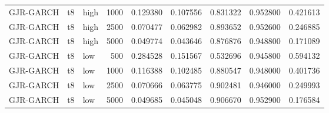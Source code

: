 \begin{tabular}{lllrrrrrr}
GJR-GARCH & t8 & high & 1000 & 0.129380 & 0.107556 & 0.831322 & 0.952800 & 0.421613 \\
GJR-GARCH & t8 & high & 2500 & 0.070477 & 0.062982 & 0.893652 & 0.952600 & 0.246885 \\
GJR-GARCH & t8 & high & 5000 & 0.049774 & 0.043646 & 0.876876 & 0.948800 & 0.171089 \\
GJR-GARCH & t8 & low & 500 & 0.284528 & 0.151567 & 0.532696 & 0.945800 & 0.594132 \\
GJR-GARCH & t8 & low & 1000 & 0.116388 & 0.102485 & 0.880547 & 0.948000 & 0.401736 \\
GJR-GARCH & t8 & low & 2500 & 0.070666 & 0.063775 & 0.902481 & 0.946000 & 0.249993 \\
GJR-GARCH & t8 & low & 5000 & 0.049685 & 0.045048 & 0.906670 & 0.952900 & 0.176584 \\
\bottomrule
\end{tabular}
